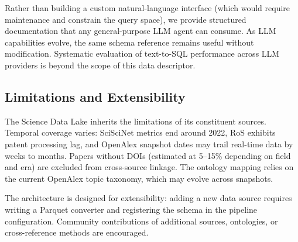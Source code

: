 Rather than building a custom natural-language interface (which would
require maintenance and constrain the query space), we provide structured
documentation that any general-purpose LLM agent can consume. As LLM
capabilities evolve, the same schema reference remains useful without
modification. Systematic evaluation of text-to-SQL performance across
LLM providers is beyond the scope of this data descriptor.

\subsection{Limitations and Extensibility}

The Science Data Lake inherits the limitations of its constituent sources.
Temporal coverage varies: SciSciNet metrics end around 2022, RoS exhibits
patent processing lag, and OpenAlex snapshot dates may trail real-time data by
weeks to months. Papers without DOIs (estimated at 5--15\% depending on field
and era) are excluded from cross-source linkage. The ontology mapping relies
on the current OpenAlex topic taxonomy, which may evolve across snapshots.

The architecture is designed for extensibility: adding a new data source
requires writing a Parquet converter and registering the schema in the
pipeline configuration. Community contributions of additional sources,
ontologies, or cross-reference methods are encouraged.
